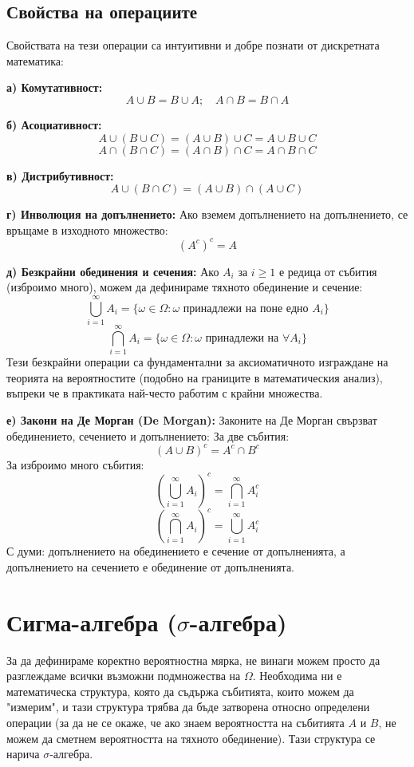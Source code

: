 \documentclass{article}
\begin{document}
\subsection{Свойства на операциите}

Свойствата на тези операции са интуитивни и добре познати от дискретната математика:

\textbf{а) Комутативност:}
\[
A \cup B = B \cup A; \quad A \cap B = B \cap A
\]

\textbf{б) Асоциативност:}
\[
A \cup (B \cup C) = (A \cup B) \cup C = A \cup B \cup C
\]
\[
A \cap (B \cap C) = (A \cap B) \cap C = A \cap B \cap C
\]

\textbf{в) Дистрибутивност:}
\[
A \cup (B \cap C) = (A \cup B) \cap (A \cup C)
\]

\textbf{г) Инволюция на допълнението:}
Ако вземем допълнението на допълнението, се връщаме в изходното множество:
\[
(A^c)^c = A
\]

\textbf{д) Безкрайни обединения и сечения:}
Ако $A_i$ за $i \ge 1$ е редица от събития (изброимо много), можем да дефинираме тяхното обединение и сечение:
\[
\bigcup_{i=1}^{\infty} A_i = \{ \omega \in \Omega : \omega \text{ принадлежи на поне едно } A_i \}
\]
\[
\bigcap_{i=1}^{\infty} A_i = \{ \omega \in \Omega : \omega \text{ принадлежи на } \forall A_i \}
\]
Тези безкрайни операции са фундаментални за аксиоматичното изграждане на теорията на вероятностите (подобно на границите в математическия анализ), въпреки че в практиката най-често работим с крайни множества.

\textbf{е) Закони на Де Морган (De Morgan):}
Законите на Де Морган свързват обединението, сечението и допълнението:
За две събития:
\[
(A \cup B)^c = A^c \cap B^c
\]
За изброимо много събития:
\[
\left(\bigcup_{i=1}^\infty A_i\right)^c = \bigcap_{i=1}^\infty A_i^c
\]
\[
\left(\bigcap_{i=1}^{\infty} A_i\right)^c = \bigcup_{i=1}^{\infty} A_i^c
\]
С думи: допълнението на обединението е сечение от допълненията, а допълнението на сечението е обединение от допълненията.

\section{Сигма-алгебра ($\sigma$-алгебра)}

За да дефинираме коректно вероятностна мярка, не винаги можем просто да разглеждаме всички възможни подмножества на $\Omega$. Необходима ни е математическа структура, която да съдържа събитията, които можем да "измерим", и тази структура трябва да бъде затворена относно определени операции (за да не се окаже, че ако знаем вероятността на събитията $A$ и $B$, не можем да сметнем вероятността на тяхното обединение). Тази структура се нарича $\sigma$-алгебра.
\end{document}
